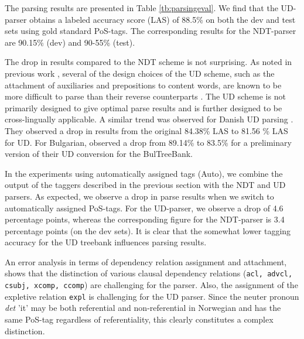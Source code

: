 \documentclass[10pt, a4paper]{article}
\begin{document}
The parsing results are presented in Table \ref{tb:parsingeval}. We
find that the UD-parser obtains a labeled accuracy score (LAS) of
88.5\% on both the dev and test sets using gold standard PoS-tags. The
corresponding results for the NDT-parser are 90.15\% (dev) and 90-55\%
(test).


The drop in results compared to the NDT scheme is not surprising. As
noted in previous work \cite{Mar:Doz:Sil:14}, several of the design
choices of the UD scheme, such as the attachment of auxiliaries and
prepositions to content words, are known to be more difficult to parse
than their reverse counterparts \cite{Sch:Abe:Rap:12}. The UD scheme
is not primarily designed to give optimal parse results and is further
designed to be cross-lingually applicable. A similar trend was
observed for Danish UD parsing \cite{Joh:Alo:Pla:15}. They observed a
drop in results from the original 84.38\% LAS to 81.56 \% LAS for UD.
For Bulgarian,  observed a drop from 89.14\% to
83.5\% for a preliminary version of their UD conversion for the BulTreeBank.

In the experiments using automatically assigned tags (Auto), we
combine the output of the taggers described in the previous section
with the NDT and UD parsers. As expected, we observe a drop in parse
results when we switch to automatically assigned PoS-tags. For the
UD-parser, we observe a drop of 4.6 percentage points, whereas the
corresponding figure for the NDT-parser is 3.4 percentage points (on
the dev sets). It is clear that the somewhat lower tagging accuracy
for the UD treebank influences parsing results.

An error analysis in terms of dependency relation assignment and
attachment, shows that the distinction of various clausal dependency
relations ({\tt acl, advcl, csubj, xcomp, ccomp}) are challenging for
the parser. Also, the assignment of the expletive relation {\tt expl}
is challenging for the UD parser. Since the neuter pronoun {\it det}
'it' may be both referential and non-referential in Norwegian and has the same
PoS-tag regardless of referentiality, this clearly constitutes a
complex distinction.
\end{document}

